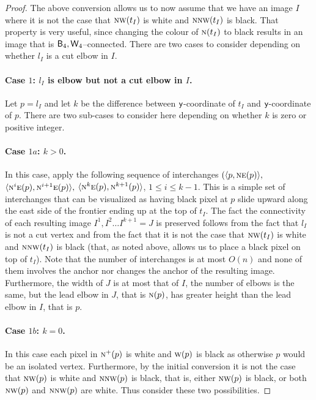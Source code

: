 \documentclass[lotsofwhite,charterfonts]{patmorin}
\newcommand{\fourfour}{\ensuremath{\protect\textup{\textsf{B}}_{4},\protect\textup{\textsf{W}}_{4}}}
\newcommand{\N}{\textsc{n}}
\newcommand{\NE}{\textsc{ne}}
\newcommand{\E}{\textsc{e}}
\newcommand{\W}{\textsc{w}}
\newcommand{\NW}{\textsc{nw}}
\newcommand{\y}{\ensuremath{\protect\textup{\textsf{y}}}}
\newcommand{\ic}[2]{\langle #1,#2 \rangle}
\begin{document}
\begin{proof}
The above conversion allows us to now assume that we have an image $I$ where it is not the case that $\NW(t_{I})$ is white and $\N\NW(t_{I})$ is black. That property is very useful, since changing the colour of $\N(t_I)$ to black results in an image that is $\fourfour$--connected. There are two cases to consider depending on whether $l_I$ is a cut elbow in $I$. 

\paragraph{Case $1$: $l_I$ is elbow but not a cut elbow in $I$.} 

Let $p=l_I$ and let $k$ be the difference between \y-coordinate of $t_I$ and \y-coordinate of $p$. There are two sub-cases to consider here depending on whether $k$ is zero or positive integer. 

\paragraph{Case $1a$: $k>0$.} In this case, apply the following sequence of interchanges $(\ic{p}{\NE(p)},$ $\ic{\N^i\E(p)}{\N^{i+1}\E(p)},$ $\ic{\N^k\E(p)}{\N^{k+1}(p)}$, $1 \leq i \leq k-1$. This is a simple set of interchanges that can be visualized as having black pixel at $p$ slide upward along the east side of the frontier ending up at the top of $t_I$. The fact the connectivity of each resulting image $I^1, I^2\dots I^{k+1}=J$ is preserved follows from the fact that $l_I$ is not a cut vertex and from the fact that it is not the case that  $\NW(t_{I})$ is white and $\N\NW(t_{I})$ is black (that, as noted above, allows us to place a black pixel on top of $t_I$). Note that the number of interchanges is at most $O(n)$ and none of them involves the anchor nor changes the anchor of the resulting image. Furthermore, the width of $J$ is at most that of $I$, the number of elbows is the same, but the lead elbow in $J$, that is $\N(p)$, has greater height than the lead elbow in $I$, that is $p$.   

\paragraph{Case $1b$: $k=0$.} In this case each pixel in $\N^+(p)$ is white and $\W(p)$ is black as otherwise $p$ would be an isolated vertex. Furthermore, by the initial conversion it is not the case that $\NW(p)$ is white and $\N\NW(p)$ is black, that is, either $\NW(p)$ is black, or both $\NW(p)$ and $\N\NW(p)$ are white. Thus consider these two possibilities.


\end{proof}
\end{document}
